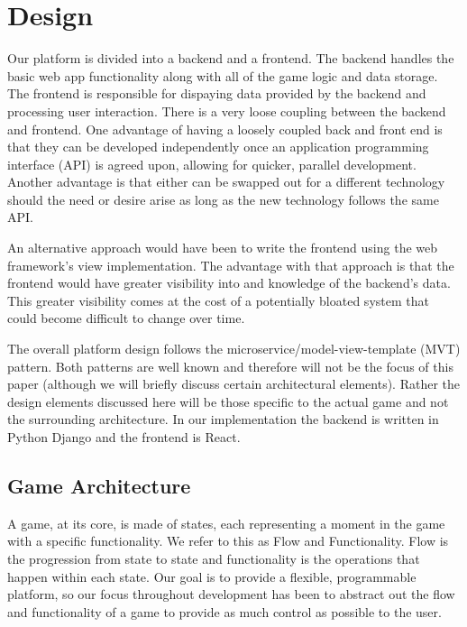 \documentclass{article}
\begin{document}
\section{Design}
Our platform is divided into a backend and a frontend. The backend handles the basic web app functionality along with all of the game logic and data storage. The frontend is responsible for dispaying data provided by the backend and processing user interaction. There is a very loose coupling between the backend and frontend. One advantage of having a loosely coupled back and front end is that they can be developed independently once an application programming interface (API) is agreed upon, allowing for quicker, parallel development. Another advantage is that either can be swapped out for a different technology should the need or desire arise as long as the new technology follows the same API.
\smallskip

An alternative approach would have been to write the frontend using the web framework's view implementation. The advantage with that approach is that the frontend would have greater visibility into and knowledge of the backend's data. This greater visibility comes at the cost of a potentially bloated system that could become difficult to change over time.
\smallskip

The overall platform design follows the microservice/model-view-template (MVT) pattern. Both patterns are well known and therefore will not be the focus of this paper (although we will briefly discuss certain architectural elements). Rather the design elements discussed here will be those specific to the actual game and not the surrounding architecture. In our implementation the backend is written in Python Django and the frontend is React.

	\subsection{Game Architecture}\label{architecture}
	    A game, at its core, is made of states, each representing a moment in the game with a specific functionality. We refer to this as Flow and Functionality. Flow is the progression from state to state and functionality is the operations that happen within each state. Our goal is to provide a flexible, programmable platform, so our focus throughout development has been to abstract out the flow and functionality of a game to provide as much control as possible to the user.
\end{document}
